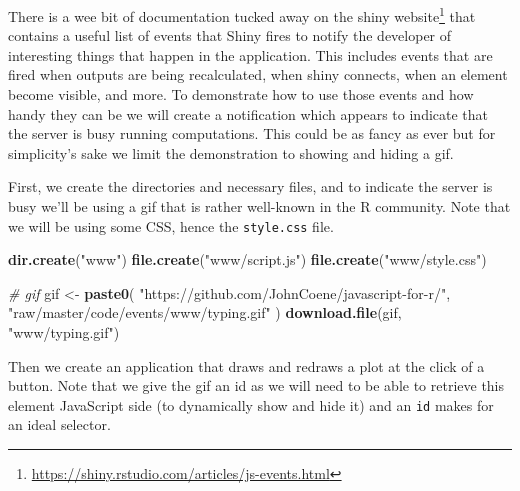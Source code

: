 \documentclass[
]{krantz}
\makeatletter
\newenvironment{Shaded}{\begin{snugshade}}{\end{snugshade}}
\newcommand{\CommentTok}[1]{\textcolor[rgb]{0.37,0.37,0.37}{\textit{#1}}}
\newcommand{\KeywordTok}[1]{\textcolor[rgb]{0.27,0.27,0.27}{\textbf{#1}}}
\newcommand{\NormalTok}[1]{#1}
\newcommand{\StringTok}[1]{\textcolor[rgb]{0.5,0.5,0.5}{#1}}
\renewcommand{\href}[2]{#2\footnote{\url{#1}}}
\newenvironment{kframe}{%
\medskip{}
\setlength{\fboxsep}{.8em}
 \def\at@end@of@kframe{}%
 \ifinner\ifhmode%
  \def\at@end@of@kframe{\end{minipage}}%
  \begin{minipage}{\columnwidth}%
 \fi\fi%
 \def\FrameCommand##1{\hskip\@totalleftmargin \hskip-\fboxsep
 \colorbox{shadecolor}{##1}\hskip-\fboxsep
     \hskip-\linewidth \hskip-\@totalleftmargin \hskip\columnwidth}%
 \MakeFramed {\advance\hsize-\width
   \@totalleftmargin\z@ \linewidth\hsize
   \@setminipage}}%
 {\par\unskip\endMakeFramed%
 \at@end@of@kframe}
\renewenvironment{Shaded}{\begin{kframe}}{\end{kframe}}
\makeatother
\begin{document}
There is a wee bit of documentation tucked away on the \href{https://shiny.rstudio.com/articles/js-events.html}{shiny website} that contains a useful list of events that Shiny fires to notify the developer of interesting things that happen in the application. This includes events that are fired when outputs are being recalculated, when shiny connects, when an element become visible, and more. To demonstrate how to use those events and how handy they can be we will create a notification which appears to indicate that the server is busy running computations. This could be as fancy as ever but for simplicity's sake we limit the demonstration to showing and hiding a gif.

First, we create the directories and necessary files, and to indicate the server is busy we'll be using a gif that is rather well-known in the R community. Note that we will be using some CSS, hence the \texttt{style.css} file.

\begin{Shaded}
\begin{Highlighting}[]
\KeywordTok{dir.create}\NormalTok{(}\StringTok{"www"}\NormalTok{)}
\KeywordTok{file.create}\NormalTok{(}\StringTok{"www/script.js"}\NormalTok{)}
\KeywordTok{file.create}\NormalTok{(}\StringTok{"www/style.css"}\NormalTok{)}

\CommentTok{\# gif}
\NormalTok{gif \textless{}{-}}\StringTok{ }\KeywordTok{paste0}\NormalTok{(}
  \StringTok{"https://github.com/JohnCoene/javascript{-}for{-}r/"}\NormalTok{,}
  \StringTok{"raw/master/code/events/www/typing.gif"}
\NormalTok{)}
\KeywordTok{download.file}\NormalTok{(gif, }\StringTok{"www/typing.gif"}\NormalTok{)}
\end{Highlighting}
\end{Shaded}

Then we create an application that draws and redraws a plot at the click of a button. Note that we give the gif an id as we will need to be able to retrieve this element JavaScript side (to dynamically show and hide it) and an \texttt{id} makes for an ideal selector.
\end{document}

